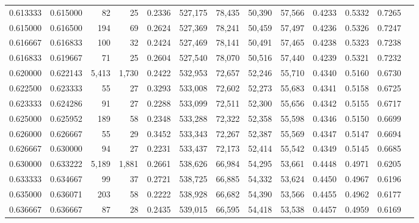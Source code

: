 \begin{tabular}{rrrrrrrrrrrrr}
0.613333 & 0.615000 &     82 &    25 &                                     0.2336 & 527,175 &  78,435 &  50,390 &  57,566 & 0.4233 & 0.5332 & 0.7265 \\
0.615000 & 0.616500 &    194 &    69 &                                     0.2624 & 527,369 &  78,241 &  50,459 &  57,497 & 0.4236 & 0.5326 & 0.7247 \\
0.616667 & 0.616833 &    100 &    32 &                                     0.2424 & 527,469 &  78,141 &  50,491 &  57,465 & 0.4238 & 0.5323 & 0.7238 \\
0.616833 & 0.619667 &     71 &    25 &                                     0.2604 & 527,540 &  78,070 &  50,516 &  57,440 & 0.4239 & 0.5321 & 0.7232 \\
0.620000 & 0.622143 &  5,413 & 1,730 &                                     0.2422 & 532,953 &  72,657 &  52,246 &  55,710 & 0.4340 & 0.5160 & 0.6730 \\
0.622500 & 0.623333 &     55 &    27 &                                     0.3293 & 533,008 &  72,602 &  52,273 &  55,683 & 0.4341 & 0.5158 & 0.6725 \\
0.623333 & 0.624286 &     91 &    27 &                                     0.2288 & 533,099 &  72,511 &  52,300 &  55,656 & 0.4342 & 0.5155 & 0.6717 \\
0.625000 & 0.625952 &    189 &    58 &                                     0.2348 & 533,288 &  72,322 &  52,358 &  55,598 & 0.4346 & 0.5150 & 0.6699 \\
0.626000 & 0.626667 &     55 &    29 &                                     0.3452 & 533,343 &  72,267 &  52,387 &  55,569 & 0.4347 & 0.5147 & 0.6694 \\
0.626667 & 0.630000 &     94 &    27 &                                     0.2231 & 533,437 &  72,173 &  52,414 &  55,542 & 0.4349 & 0.5145 & 0.6685 \\
0.630000 & 0.633222 &  5,189 & 1,881 &                                     0.2661 & 538,626 &  66,984 &  54,295 &  53,661 & 0.4448 & 0.4971 & 0.6205 \\
0.633333 & 0.634667 &     99 &    37 &                                     0.2721 & 538,725 &  66,885 &  54,332 &  53,624 & 0.4450 & 0.4967 & 0.6196 \\
0.635000 & 0.636071 &    203 &    58 &                                     0.2222 & 538,928 &  66,682 &  54,390 &  53,566 & 0.4455 & 0.4962 & 0.6177 \\
0.636667 & 0.636667 &     87 &    28 &                                     0.2435 & 539,015 &  66,595 &  54,418 &  53,538 & 0.4457 & 0.4959 & 0.6169 \\

\end{tabular}
